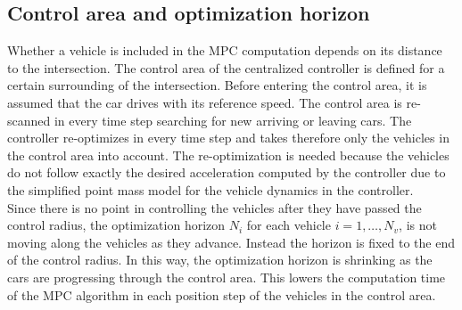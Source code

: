 \documentclass[letterpaper,10pt,conference]{ieeeconf}
\begin{document}
\subsection{Control area and optimization horizon}
Whether a vehicle is included in the MPC computation depends on its distance to the intersection. The control area of the centralized controller is defined for a certain surrounding of the intersection. Before entering the control area, it is assumed that the car drives with its reference speed. The control area is re-scanned in every time step searching for new arriving or leaving cars. The controller re-optimizes in every time step and takes therefore only the vehicles in the control area into account. The re-optimization is needed because the vehicles do not follow exactly the desired acceleration computed by the controller due to the simplified point mass model for the vehicle dynamics in the controller.\\ \indent
Since there is no point in controlling the vehicles after they have passed the control radius, the optimization horizon $N_i$ for each vehicle $i = 1,\ldots,N_v$, is not moving along the vehicles as they advance. Instead the horizon is fixed to the end of the control radius. In this way, the optimization horizon is shrinking as the cars are progressing through the control area. This lowers the computation time of the MPC algorithm in each position step of the vehicles in the control area.
\end{document}
